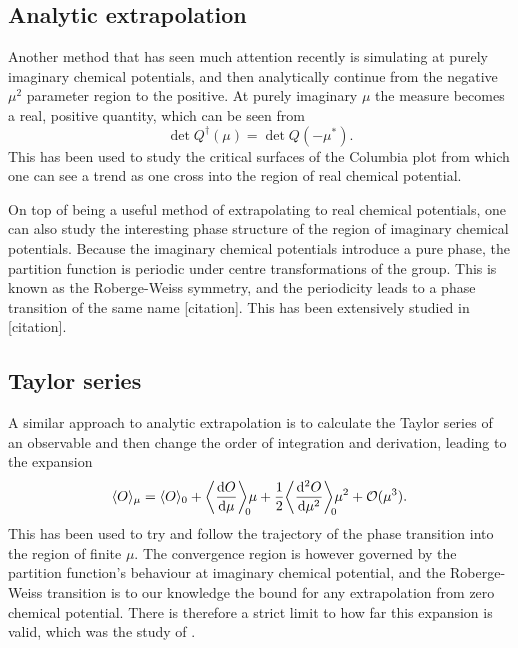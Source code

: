 \subsection{Analytic extrapolation}


Another method that has seen much attention recently is simulating at purely
imaginary chemical potentials, and then analytically continue from the negative
$\mu^2$ parameter region to the positive. At purely imaginary $\mu$ the measure
becomes a real, positive quantity, which can be seen from
%
\begin{equation}
  \det Q^{\dagger} (\mu) = \det Q(-\mu^*).
\end{equation}
%
This has been used to study the critical surfaces of the Columbia plot from
which one can see a trend as one cross into the region of real chemical
potential.

On top of being a useful method of extrapolating to real chemical potentials,
one can also study the interesting phase structure of the region of imaginary
chemical potentials. Because the imaginary chemical potentials introduce a pure
phase, the partition function is periodic under centre transformations of the
group. This is known as the Roberge-Weiss symmetry, and the periodicity leads to
a phase transition of the same name [citation]. This has been extensively studied in
[citation].

\subsection{Taylor series}

A similar approach to analytic extrapolation is to calculate the Taylor series
of an observable and then change the order of integration and derivation,
leading to the expansion
%
\begin{equation}
  \langle O \rangle_{\mu} = \langle O \rangle_{0}
   + \bigg\langle \frac{\mathrm{d} O}{\mathrm{d} \mu} \bigg\rangle_{\mathclap{0}} \mu
   + \frac{1}{2} \bigg\langle \frac{\mathrm{d}^2 O}{\mathrm{d} \mu^2} \bigg\rangle_{\mathclap{0}} \mu^2
   + \mathcal{O}(\mu^3).
\end{equation}
%
This has been used to try and follow the trajectory of the phase transition into
the region of finite $\mu$. The convergence region is however governed by the
partition function's behaviour at imaginary chemical potential, and the
Roberge-Weiss transition is to our knowledge the bound for any extrapolation
from zero chemical potential. There is therefore a strict limit to how far this
expansion is valid, which was the study of \citep{Osborn:2008eg}.

